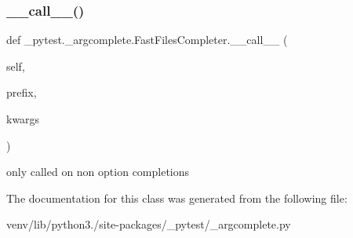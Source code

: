 \subsubsection{\texorpdfstring{\+\_\+\+\_\+call\+\_\+\+\_\+()}{\_\_call\_\_()}}
{\footnotesize\ttfamily def \+\_\+pytest.\+\_\+argcomplete.\+Fast\+Files\+Completer.\+\_\+\+\_\+call\+\_\+\+\_\+ (\begin{DoxyParamCaption}\item[{}]{self,  }\item[{}]{prefix,  }\item[{}]{kwargs }\end{DoxyParamCaption})}

\begin{DoxyVerb}only called on non option completions\end{DoxyVerb}
 

The documentation for this class was generated from the following file\+:\begin{DoxyCompactItemize}
\item 
venv/lib/python3./site-\/packages/\+\_\+pytest/\+\_\+argcomplete.\+py\end{DoxyCompactItemize}
